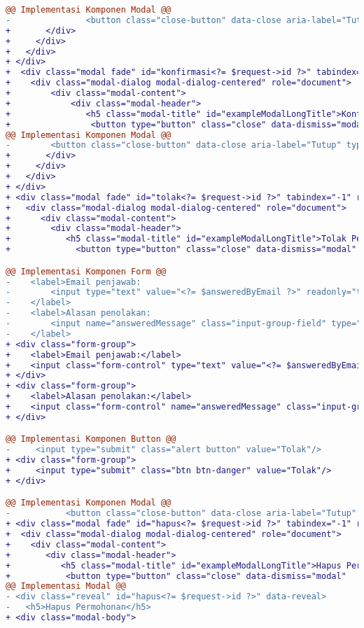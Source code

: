 \begin{lstlisting}[language=diff, caption=Perubahan file \path{\views\PerubahanKuliahManage\main.php}, label=Entri, basicstyle=\ttfamily, frame=single,
columns=fullflexible, keepspaces=true, breaklines=true]
@@ Implementasi Komponen Modal @@
-               <button class="close-button" data-close aria-label="Tutup" type="button">
+       </div>
+     </div>
+   </div>
+ </div>
+  <div class="modal fade" id="konfirmasi<?= $request->id ?>" tabindex="-1" role="dialog" aria-hidden="true">
+    <div class="modal-dialog modal-dialog-centered" role="document">
+        <div class="modal-content">
+            <div class="modal-header">
+               <h5 class="modal-title" id="exampleModalLongTitle">Konfirmasi Permohonan #<?= $request->id ?></h5>
+                <button type="button" class="close" data-dismiss="modal" aria-label="Close">
@@ Implementasi Komponen Modal @@
-        <button class="close-button" data-close aria-label="Tutup" type="button">
+       </div>
+     </div>
+   </div>
+ </div>
+ <div class="modal fade" id="tolak<?= $request->id ?>" tabindex="-1" role="dialog" aria-hidden="true">
+   <div class="modal-dialog modal-dialog-centered" role="document">
+      <div class="modal-content">
+        <div class="modal-header">
+           <h5 class="modal-title" id="exampleModalLongTitle">Tolak Permohonan #<?= $request->id ?></h5>
+             <button type="button" class="close" data-dismiss="modal" 

@@ Implementasi Komponen Form @@
-    <label>Email penjawab:
-        <input type="text" value="<?= $answeredByEmail ?>" readonly="true"/>
-    </label>
-    <label>Alasan penolakan:
-        <input name="answeredMessage" class="input-group-field" type="text" required/>
-    </label>
+ <div class="form-group">
+    <label>Email penjawab:</label>
+    <input class="form-control" type="text" value="<?= $answeredByEmail ?>" readonly="true"/>
+ </div>
+ <div class="form-group">
+    <label>Alasan penolakan:</label>
+    <input class="form-control" name="answeredMessage" class="input-group-field" type="text" required/>
+ </div>

@@ Implementasi Komponen Button @@                                       
-     <input type="submit" class="alert button" value="Tolak"/>
+ <div class="form-group">
+     <input type="submit" class="btn btn-danger" value="Tolak"/>
+ </div>

@@ Implementasi Komponen Modal @@
-    	    <button class="close-button" data-close aria-label="Tutup" type="button">
+ <div class="modal fade" id="hapus<?= $request->id ?>" tabindex="-1" role="dialog" aria-hidden="true">
+  <div class="modal-dialog modal-dialog-centered" role="document">
+    <div class="modal-content">
+       <div class="modal-header">
+          <h5 class="modal-title" id="exampleModalLongTitle">Hapus Permohonan #<?= $request->id ?></h5>
+           <button type="button" class="close" data-dismiss="modal" 
@@ Implementasi Modal @@
- <div class="reveal" id="hapus<?= $request->id ?>" data-reveal>
-	<h5>Hapus Permohonan</h5>
+ <div class="modal-body">



\end{lstlisting}
